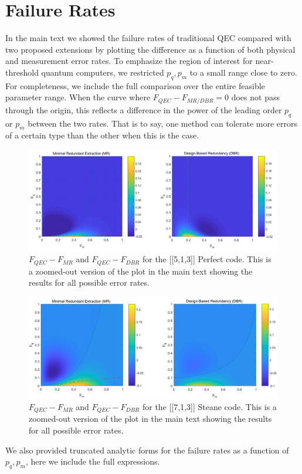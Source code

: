 \documentclass[superscriptaddress, notitlepage]{revtex4-1}
\begin{document}
\section{Failure Rates}

In the main text we showed the failure rates of traditional QEC compared with two proposed extensions by plotting the difference as a function of both physical and measurement error rates. To emphasize the region of interest for near-threshold quantum computers, we restricted $p_q, p_m$ to a small range close to zero. For completeness, we include the full comparison over the entire feasible parameter range. When the curve where $F_{QEC} - F_{MR/DBR} = 0$ does not pass through the origin, this reflects a difference in the power of the leading order $p_q$ or $p_m$ between the two rates. That is to say, one method can tolerate more errors of a certain type than the other when this is the case.

\begin{figure}
	\centering
	\includegraphics[width=\linewidth]{5_qubit_crop.png}
	\caption{$F_{QEC} - F_{MR}$ and $F_{QEC} - F_{DBR}$ for the [[5,1,3]] Perfect code. This is a zoomed-out version of the plot in the main text showing the results for all possible error rates.}
	\label{fig:5qubitperfectcodefullrange}
\end{figure}

\begin{figure}
	\centering
	\includegraphics[width=\linewidth]{steane_crop.png}
	\caption{$F_{QEC} - F_{MR}$ and $F_{QEC} - F_{DBR}$ for the [[7,1,3]] Steane code. This is a zoomed-out version of the plot in the main text showing the results for all possible error rates.}
	\label{fig:steanecodefullrange}
\end{figure}

We also provided truncated analytic forms for the failure rates as a function of $p_q, p_m$, here we include the full expressions.
\end{document}
